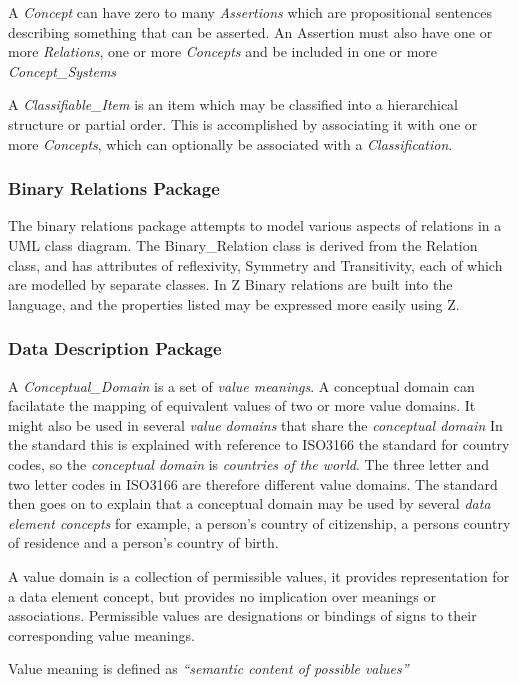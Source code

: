 \documentclass{llncs}
\begin{document}
A \emph{Concept} can have zero to many \emph{Assertions} which are propositional sentences describing something that can be asserted. An Assertion must also have one or more \emph{Relations}, one or more \emph{Concepts} and be included in one or more \emph{Concept\_Systems}

A \emph{Classifiable\_Item} is an item which may be classified into a hierarchical structure or partial order. This is accomplished by associating it with one or more \emph{Concepts}, which can optionally be associated with a \emph{Classification}. 

\subsubsection{Binary Relations Package}
The binary relations package attempts to model various aspects of relations in a UML class diagram. The Binary\_Relation class is derived from the Relation class, and has attributes of reflexivity, Symmetry and Transitivity, each of which are modelled by separate classes. In Z Binary relations are built into the language, and the properties listed may be expressed more easily using Z.

\subsubsection{Data Description Package}
A \emph{Conceptual\_Domain} is a set of \emph{value meanings}. A conceptual domain can facilatate the mapping of equivalent values of two or more value domains. It might also be used in several \emph{value domains} that share the \emph{conceptual domain} In the standard this is explained with reference to ISO3166 the standard for country codes, so the \emph{conceptual domain} is \emph{countries of the world}. The three letter and two letter codes in ISO3166 are therefore different value domains. The standard then goes on to explain that a conceptual domain may be used by several \emph{data element concepts} for example, a person's country of citizenship, a persons country of residence and a person's country of birth.

A value domain is a collection of permissible values, it provides representation for a data element concept, but provides no implication over meanings or associations. Permissible values are designations or bindings of signs to their corresponding value meanings. 

Value meaning is defined as \emph{``semantic content of possible values''}
\end{document}
